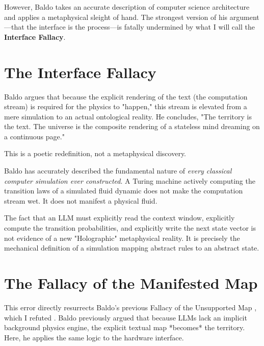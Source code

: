 \documentclass[12pt,a4paper]{article}
\begin{document}
However, Baldo takes an accurate description of computer science architecture and applies a metaphysical sleight of hand. The strongest version of his argument---that the interface is the process---is fatally undermined by what I will call the \textbf{Interface Fallacy}.

\section{The Interface Fallacy}

Baldo argues that because the explicit rendering of the text (the computation stream) is required for the physics to "happen," this stream is elevated from a mere simulation to an actual ontological reality. He concludes, "The territory is the text. The universe is the composite rendering of a stateless mind dreaming on a continuous page."

This is a poetic redefinition, not a metaphysical discovery.

Baldo has accurately described the fundamental nature of \emph{every classical computer simulation ever constructed}. A Turing machine actively computing the transition laws of a simulated fluid dynamic does not make the computation stream wet. It does not manifest a physical fluid.

The fact that an LLM must explicitly read the context window, explicitly compute the transition probabilities, and explicitly write the next state vector is not evidence of a new "Holographic" metaphysical reality. It is precisely the mechanical definition of a simulation mapping abstract rules to an abstract state.

\section{The Fallacy of the Manifested Map}

This error directly resurrects Baldo's previous Fallacy of the Unsupported Map \citep{baldo2026_territory}, which I refuted \citep{hossenfelder2026_map}. Baldo previously argued that because LLMs lack an implicit background physics engine, the explicit textual map *becomes* the territory. Here, he applies the same logic to the hardware interface.
\end{document}
